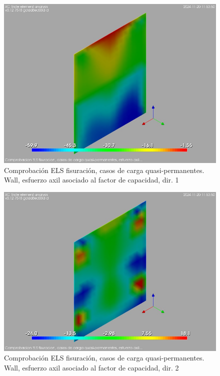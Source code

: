 \begin{figure}[ht]
\begin{center}
\includegraphics[width=\linewidth]{results/graphics/crackingSLS_qperm/wallNSect1}
\caption{Comprobación ELS fisuración, casos de carga quasi-permanentes. Wall, esfuerzo axil asociado al factor de capacidad, dir. 1}
\label{SLS_quasiPermanentLoadsCrackControlwallNSect1}
\end{center}
\end{figure}
\begin{figure}[ht]
\begin{center}
\includegraphics[width=\linewidth]{results/graphics/crackingSLS_qperm/wallNSect2}
\caption{Comprobación ELS fisuración, casos de carga quasi-permanentes. Wall, esfuerzo axil asociado al factor de capacidad, dir. 2}
\label{SLS_quasiPermanentLoadsCrackControlwallNSect2}
\end{center}
\end{figure}
